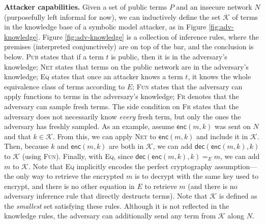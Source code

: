 \documentclass{article}
\theoremstyle{definition}
\begin{document}
\textbf{Attacker capabilities.} 
Given a set of public terms $P$ and an insecure network $N$ (purposefully left informal for now), 
we can inductively define the set $\mathcal{K}$ of terms in the knowledge base of a symbolic model attacker, 
as in Figure \ref{fig:adv-knowledge}. Figure \ref{fig:adv-knowledge} is a collection of inference rules, 
where the premises (interpreted conjunctively) are on top of the bar, and the conclusion is below. 
\textsc{Pub} states that if a term $t$ is public, then it is in the adversary's knowledge; 
\textsc{Net} states that terms on the public network are in the adversary's knowledge; 
\textsc{Eq} states that once an attacker knows a term $t$, it knows the whole equivalence class of terms according to $E$;
\textsc{Fun} states that the adversary can apply functions to terms in the adversary's knowledge; 
\textsc{Fr} denotes that the adversary can sample fresh terms. 
The side condition on \textsc{Fr} states that the adversary does not necessarily know \emph{every} fresh term, 
but only the ones the adversary has freshly sampled. 
As an example, assume $\textsf{enc}(m, k)$ was sent on $N$ and that $k \in \mathcal{K}$. 
From this, we can apply \textsc{Net} to $\textsf{enc}(m, k)$ and include it in $\mathcal{K}$. 
Then, because $k$ and $\textsf{enc}(m, k)$ are both in $\mathcal{K}$, 
we can add $\textsf{dec}(\textsf{enc}(m, k), k)$ to $\mathcal{K}$ (using \textsc{Fun}). 
Finally, with \textsc{Eq}, since $\textsf{dec}(\textsf{enc}(m, k), k) =_E m$, 
we can add $m$ to $\mathcal{K}$. 
Note that \textsc{Eq} implicitly encodes the perfect cryptography assumption---the only way 
to retrieve the encrypted $m$ is to decrypt with the same key used to encrypt, 
and there is no other equation in $E$ to retrieve $m$ (and there is no adversary inference rule that directly destructs terms).
Note that $\mathcal{K}$ is defined as the \emph{smallest} set satisfying these rules.
Although it is not reflected in the knowledge rules, the adversary can additionally send any term from $\mathcal{K}$ along $N$.
\end{document}
